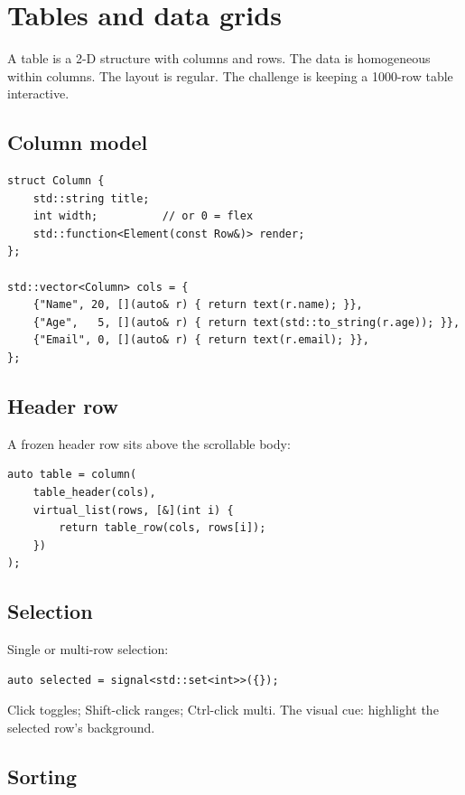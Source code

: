 \chapter{Tables and data grids}
\label{ch:tables}

\begin{aside}
A table is a 2-D structure with columns and rows. The data is
homogeneous within columns. The layout is regular. The
challenge is keeping a 1000-row table interactive.
\end{aside}

\section{Column model}

\begin{lstlisting}
struct Column {
    std::string title;
    int width;          // or 0 = flex
    std::function<Element(const Row&)> render;
};

std::vector<Column> cols = {
    {"Name", 20, [](auto& r) { return text(r.name); }},
    {"Age",   5, [](auto& r) { return text(std::to_string(r.age)); }},
    {"Email", 0, [](auto& r) { return text(r.email); }},
};
\end{lstlisting}

\section{Header row}

A frozen header row sits above the scrollable body:

\begin{lstlisting}
auto table = column(
    table_header(cols),
    virtual_list(rows, [&](int i) {
        return table_row(cols, rows[i]);
    })
);
\end{lstlisting}

\section{Selection}

Single or multi-row selection:

\begin{lstlisting}
auto selected = signal<std::set<int>>({});
\end{lstlisting}

Click toggles; Shift-click ranges; Ctrl-click multi. The
visual cue: highlight the selected row's background.

\section{Sorting}

